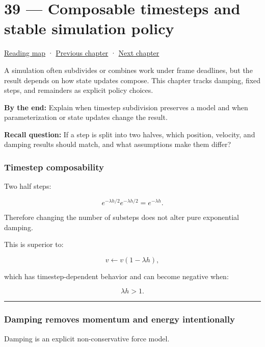 \hypertarget{06-engine-ii-ch039}{}
\section{39 --- Composable timesteps and stable simulation policy}\label{composable-timesteps-and-stable-simulation-policy}

\href{Chapter\%20Edition/03\%20-\%20Game\%20Engine/00\%20-\%20Reading\%20Map}{Reading map} · \hyperref[06-engine-ii-ch038]{Previous chapter} · \hyperref[06-engine-ii-ch040]{Next chapter}

A simulation often subdivides or combines work under frame deadlines, but the result depends on how state updates compose. This chapter tracks damping, fixed steps, and remainders as explicit policy choices.

\textbf{By the end:} Explain when timestep subdivision preserves a model and when parameterization or state updates change the result.

\textbf{Recall question:} If a step is split into two halves, which position, velocity, and damping results should match, and what assumptions make them differ?

\subsubsection{Timestep composability}\label{timestep-composability}

Two half steps:

\[
e^{-\lambda h/2}
e^{-\lambda h/2}
=
e^{-\lambda h}.
\]

Therefore changing the number of substeps does not alter pure exponential damping.

This is superior to:

\[
v\leftarrow v(1-\lambda h),
\]

which has timestep-dependent behavior and can become negative when:

\[
\lambda h>1.
\]

\begin{center}\rule{0.5\linewidth}{0.5pt}\end{center}

\subsubsection{Damping removes momentum and energy intentionally}\label{damping-removes-momentum-and-energy-intentionally}

Damping is an explicit non-conservative force model.


